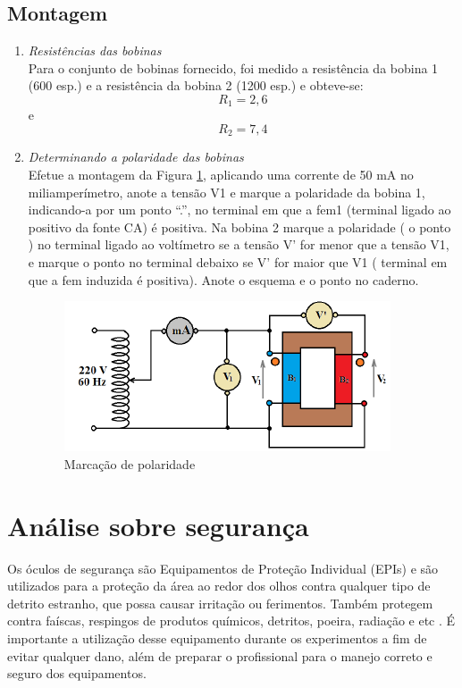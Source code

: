 \documentclass[a4paper,12pt,oneside,openany,table,xcdraw]{article}
\begin{document}
\subsection{Montagem} %
\begin{enumerate}[1)]
\item \emph{Resistências das bobinas}\\
Para o conjunto de bobinas fornecido, foi medido a resistência da bobina 1 (600 esp.) e a
resistência da bobina 2 (1200 esp.) e obteve-se: 
$$R_1= 2,6$$ e $$R_2=7,4$$

\item \emph{Determinando a polaridade das bobinas}\\
Efetue a montagem da Figura \ref{2.2}, aplicando uma corrente de 50 mA no
miliamperímetro, anote a tensão V1 e marque a
polaridade da bobina 1, indicando-a por um ponto “.”, no terminal em que a fem1 (terminal
ligado ao positivo da fonte CA) é positiva. Na bobina 2 marque a polaridade ( o ponto ) no
terminal ligado ao voltímetro se a tensão V’ for menor que a tensão V1, e marque o ponto no
terminal debaixo se V’ for maior que V1 ( terminal em que a fem induzida é positiva). Anote
o esquema e o ponto no caderno.


\begin{figure}[!htb]
\centering
\includegraphics{fig1}
\caption{Marcação de polaridade}
\label{2.2}
\end{figure}


\end{enumerate}

\section{Análise sobre segurança} %
Os óculos de segurança são Equipamentos de Proteção Individual (EPIs) e são utilizados para a proteção da área ao redor dos olhos contra qualquer tipo de detrito estranho, que possa causar irritação ou ferimentos. Também protegem contra faíscas, respingos de produtos químicos, detritos, poeira, radiação e etc \cite{safe}.
É importante a utilização desse equipamento durante os experimentos a fim de evitar qualquer dano, além de preparar o profissional para o manejo correto e seguro dos equipamentos.
\end{document}
